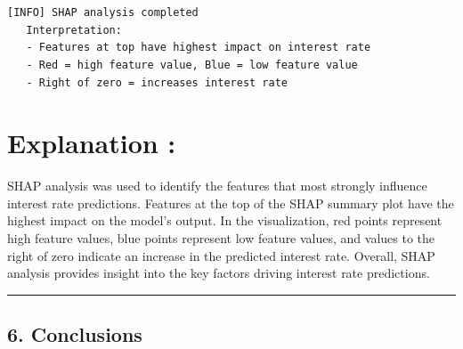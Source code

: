 \documentclass[11pt]{article}
\begin{document}
    \begin{center}
    \end{center}
    { \hspace*{\fill} \\}
    
    \begin{Verbatim}[commandchars=\\\{\}]

[INFO] SHAP analysis completed
   Interpretation:
   - Features at top have highest impact on interest rate
   - Red = high feature value, Blue = low feature value
   - Right of zero = increases interest rate
    \end{Verbatim}

    \section{Explanation :}\label{explanation}

SHAP analysis was used to identify the features that most strongly
influence interest rate predictions. Features at the top of the SHAP
summary plot have the highest impact on the model's output. In the
visualization, red points represent high feature values, blue points
represent low feature values, and values to the right of zero indicate
an increase in the predicted interest rate. Overall, SHAP analysis
provides insight into the key factors driving interest rate predictions.

    \begin{center}\rule{0.5\linewidth}{0.5pt}\end{center}

\subsection{6. Conclusions}\label{conclusions}
\end{document}
